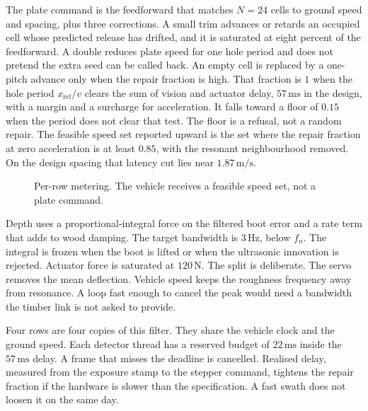 \documentclass[11pt,a4paper]{article}
\begin{document}
The plate command is the feedforward that matches \(N=24\) cells to ground speed and spacing, plus three corrections. A small trim advances or retards an occupied cell whose predicted release has drifted, and it is saturated at eight percent of the feedforward. A double reduces plate speed for one hole period and does not pretend the extra seed can be called back. An empty cell is replaced by a one-pitch advance only when the repair fraction is high. That fraction is \(1\) when the hole period \(x_{\mathrm{ref}}/v\) clears the sum of vision and actuator delay, \(57\,\mathrm{ms}\) in the design, with a margin and a surcharge for acceleration. It falls toward a floor of \(0.15\) when the period does not clear that test. The floor is a refusal, not a random repair. The feasible speed set reported upward is the set where the repair fraction at zero acceleration is at least \(0.85\), with the resonant neighbourhood removed. On the design spacing that latency cut lies near \(1.87\,\mathrm{m/s}\).

\begin{figure}[t]
\centering
{}
\caption{Per-row metering. The vehicle receives a feasible speed set, not a plate command.}
\label{fig:loop}
\end{figure}

Depth uses a proportional-integral force on the filtered boot error and a rate term that adds to wood damping. The target bandwidth is \(3\,\mathrm{Hz}\), below \(f_n\). The integral is frozen when the boot is lifted or when the ultrasonic innovation is rejected. Actuator force is saturated at \(120\,\mathrm{N}\). The split is deliberate. The servo removes the mean deflection. Vehicle speed keeps the roughness frequency away from resonance. A loop fast enough to cancel the peak would need a bandwidth the timber link is not asked to provide.

Four rows are four copies of this filter. They share the vehicle clock and the ground speed. Each detector thread has a reserved budget of \(22\,\mathrm{ms}\) inside the \(57\,\mathrm{ms}\) delay. A frame that misses the deadline is cancelled. Realised delay, measured from the exposure stamp to the stepper command, tightens the repair fraction if the hardware is slower than the specification. A fast swath does not loosen it on the same day.
\end{document}
